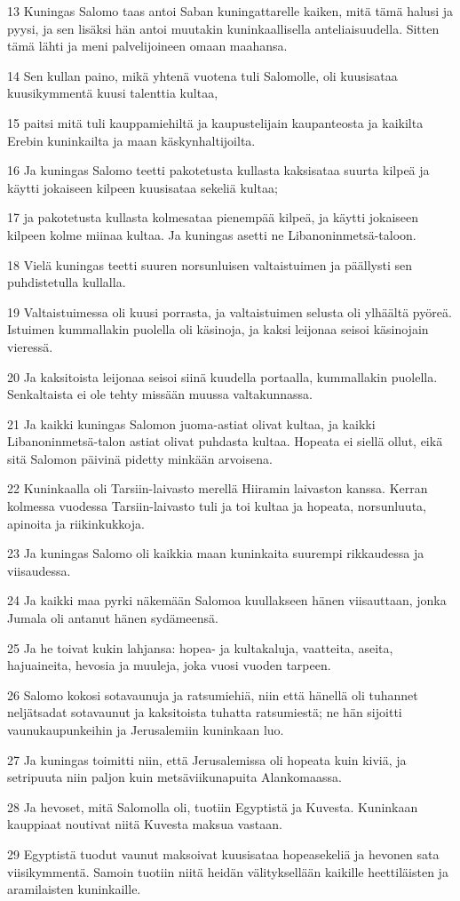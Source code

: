 \par 13 Kuningas Salomo taas antoi Saban kuningattarelle kaiken, mitä tämä halusi ja pyysi, ja sen lisäksi hän antoi muutakin kuninkaallisella anteliaisuudella. Sitten tämä lähti ja meni palvelijoineen omaan maahansa.
\par 14 Sen kullan paino, mikä yhtenä vuotena tuli Salomolle, oli kuusisataa kuusikymmentä kuusi talenttia kultaa,
\par 15 paitsi mitä tuli kauppamiehiltä ja kaupustelijain kaupanteosta ja kaikilta Erebin kuninkailta ja maan käskynhaltijoilta.
\par 16 Ja kuningas Salomo teetti pakotetusta kullasta kaksisataa suurta kilpeä ja käytti jokaiseen kilpeen kuusisataa sekeliä kultaa;
\par 17 ja pakotetusta kullasta kolmesataa pienempää kilpeä, ja käytti jokaiseen kilpeen kolme miinaa kultaa. Ja kuningas asetti ne Libanoninmetsä-taloon.
\par 18 Vielä kuningas teetti suuren norsunluisen valtaistuimen ja päällysti sen puhdistetulla kullalla.
\par 19 Valtaistuimessa oli kuusi porrasta, ja valtaistuimen selusta oli ylhäältä pyöreä. Istuimen kummallakin puolella oli käsinoja, ja kaksi leijonaa seisoi käsinojain vieressä.
\par 20 Ja kaksitoista leijonaa seisoi siinä kuudella portaalla, kummallakin puolella. Senkaltaista ei ole tehty missään muussa valtakunnassa.
\par 21 Ja kaikki kuningas Salomon juoma-astiat olivat kultaa, ja kaikki Libanoninmetsä-talon astiat olivat puhdasta kultaa. Hopeata ei siellä ollut, eikä sitä Salomon päivinä pidetty minkään arvoisena.
\par 22 Kuninkaalla oli Tarsiin-laivasto merellä Hiiramin laivaston kanssa. Kerran kolmessa vuodessa Tarsiin-laivasto tuli ja toi kultaa ja hopeata, norsunluuta, apinoita ja riikinkukkoja.
\par 23 Ja kuningas Salomo oli kaikkia maan kuninkaita suurempi rikkaudessa ja viisaudessa.
\par 24 Ja kaikki maa pyrki näkemään Salomoa kuullakseen hänen viisauttaan, jonka Jumala oli antanut hänen sydämeensä.
\par 25 Ja he toivat kukin lahjansa: hopea- ja kultakaluja, vaatteita, aseita, hajuaineita, hevosia ja muuleja, joka vuosi vuoden tarpeen.
\par 26 Salomo kokosi sotavaunuja ja ratsumiehiä, niin että hänellä oli tuhannet neljätsadat sotavaunut ja kaksitoista tuhatta ratsumiestä; ne hän sijoitti vaunukaupunkeihin ja Jerusalemiin kuninkaan luo.
\par 27 Ja kuningas toimitti niin, että Jerusalemissa oli hopeata kuin kiviä, ja setripuuta niin paljon kuin metsäviikunapuita Alankomaassa.
\par 28 Ja hevoset, mitä Salomolla oli, tuotiin Egyptistä ja Kuvesta. Kuninkaan kauppiaat noutivat niitä Kuvesta maksua vastaan.
\par 29 Egyptistä tuodut vaunut maksoivat kuusisataa hopeasekeliä ja hevonen sata viisikymmentä. Samoin tuotiin niitä heidän välityksellään kaikille heettiläisten ja aramilaisten kuninkaille.

